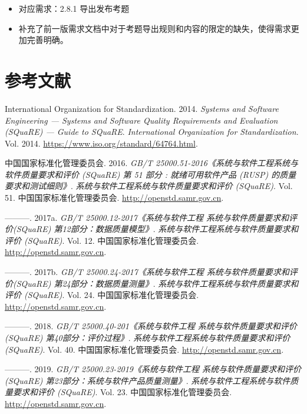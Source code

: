\documentclass[hyperref, a4paper]{ctexart}
\providecommand{\tightlist}{%
  \setlength{\itemsep}{0pt}\setlength{\parskip}{0pt}}
\begin{document}
\begin{itemize}
\tightlist
\item
  对应需求：2.8.1 导出发布考题
\item
  补充了前一版需求文档中对于考题导出规则和内容的限定的缺失，使得需求更加完善明确。
\end{itemize}

\pagebreak

\hypertarget{ux53c2ux8003ux6587ux732e}{%
\section*{参考文献}\label{ux53c2ux8003ux6587ux732e}}

\hypertarget{refs}{}
\leavevmode\hypertarget{ref-innovativeInternationalisation}{}%
International Organization for Standardization. 2014. \emph{Systems and
Software Engineering --- Systems and Software Quality Requirements and
Evaluation (SQuaRE) --- Guide to SQuaRE}. \emph{International
Organization for Standardization}. Vol. 2014.
\url{https://www.iso.org/standard/64764.html}.

\leavevmode\hypertarget{ref-innovative1}{}%
中国国家标准化管理委员会. 2016. \emph{GB/T
25000.51-2016《系统与软件工程系统与软件质量要求和评价 (SQuaRE) 第 51
部分 : 就绪可用软件产品 (RUSP) 的质量要求和测试细则》}.
\emph{系统与软件工程系统与软件质量要求和评价 (SQuaRE)}. Vol. 51.
中国国家标准化管理委员会. \url{http://openstd.samr.gov.cn}.

\leavevmode\hypertarget{ref-innovative3}{}%
---------. 2017a. \emph{GB/T 25000.12-2017《系统与软件工程
系统与软件质量要求和评价(SQuaRE) 第12部分：数据质量模型》}.
\emph{系统与软件工程系统与软件质量要求和评价 (SQuaRE)}. Vol. 12.
中国国家标准化管理委员会. \url{http://openstd.samr.gov.cn}.

\leavevmode\hypertarget{ref-innovative4}{}%
---------. 2017b. \emph{GB/T 25000.24-2017《系统与软件工程
系统与软件质量要求和评价(SQuaRE) 第24部分：数据质量测量》}.
\emph{系统与软件工程系统与软件质量要求和评价 (SQuaRE)}. Vol. 24.
中国国家标准化管理委员会. \url{http://openstd.samr.gov.cn}.

\leavevmode\hypertarget{ref-innovative5}{}%
---------. 2018. \emph{GB/T 25000.40-201《系统与软件工程
系统与软件质量要求和评价(SQuaRE) 第40部分：评价过程》}.
\emph{系统与软件工程系统与软件质量要求和评价 (SQuaRE)}. Vol. 40.
中国国家标准化管理委员会. \url{http://openstd.samr.gov.cn}.

\leavevmode\hypertarget{ref-innovative2}{}%
---------. 2019. \emph{GB/T 25000.23-2019《系统与软件工程
系统与软件质量要求和评价(SQuaRE) 第23部分：系统与软件产品质量测量》}.
\emph{系统与软件工程系统与软件质量要求和评价 (SQuaRE)}. Vol. 23.
中国国家标准化管理委员会. \url{http://openstd.samr.gov.cn}.
\end{document}
